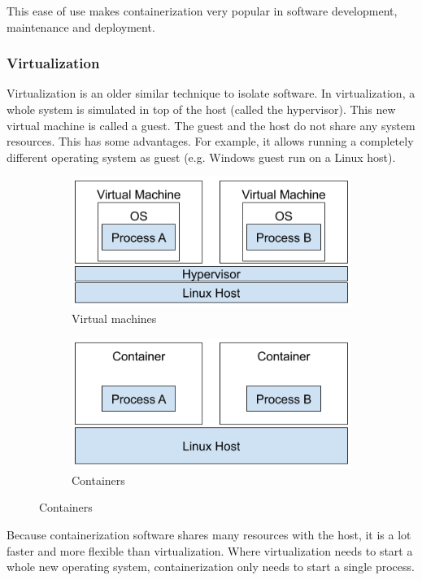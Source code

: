 \hfill

This ease of use makes containerization very popular in software development, maintenance and deployment.

\pagebreak

\subsubsection{Virtualization}
Virtualization is an older similar technique to isolate software. In virtualization, a whole system is simulated in top of the host (called the hypervisor). This new virtual machine is called a guest. The guest and the host do not share any system resources. This has some advantages. For example, it allows running a completely different operating system as guest (e.g. Windows guest run on a Linux host).

\begin{figure}[ht]
    \begin{subfigure}{.45\textwidth}
        \centering
        \includegraphics[width=.8\linewidth]{resources/images/virtual-machines.png}
        \caption{Virtual machines}
    \end{subfigure}
    \begin{subfigure}{.45\textwidth}
        \centering
        \includegraphics[width=.8\linewidth]{resources/images/containers.png}
        \caption{Containers}
    \end{subfigure}
\end{figure}

Because containerization software shares many resources with the host, it is a lot faster and more flexible than virtualization. Where virtualization needs to start a whole new operating system, containerization only needs to start a single process.

